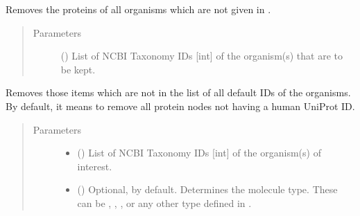 \documentclass[letterpaper,10pt,english]{sphinxmanual}
\begin{document}
\begin{fulllineitems}
\begin{fulllineitems}
\begin{quote}
\begin{description}
\begin{itemize}
\end{itemize}

\end{description}\end{quote}

\end{fulllineitems}


\begin{fulllineitems}
\label{\detokenize{main:pypath.main.PyPath.delete_by_taxon}}
Removes the proteins of all organisms which are not given in
.
\begin{quote}\begin{description}
\item[{Parameters}] \leavevmode
{} () \textendash{} List of NCBI Taxonomy IDs {[}int{]} of the organism(s) that are
to be kept.

\end{description}\end{quote}

\end{fulllineitems}


\begin{fulllineitems}
\label{\detokenize{main:pypath.main.PyPath.delete_unknown}}
Removes those items which are not in the list of all default
IDs of the organisms. By default, it means to remove all protein
nodes not having a human UniProt ID.
\begin{quote}\begin{description}
\item[{Parameters}] \leavevmode\begin{itemize}
\item {} 
 () \textendash{} List of NCBI Taxonomy IDs {[}int{]} of the organism(s) of
interest.

\item {} 
 () \textendash{} Optional,  by default. Determines the molecule
type. These can be , , ,
 or any other type defined in
.


\end{itemize}
\end{description}
\end{quote}
\end{fulllineitems}
\end{fulllineitems}
\end{document}
